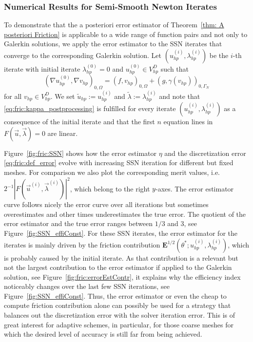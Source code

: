 \documentclass[12pt,twoside,reqno]{amsart}
\theoremstyle{definition}
\numberwithin{equation}{section}
\begin{document}
\subsubsection{Numerical Results for Semi-Smooth Newton Iterates}
To demonstrate that the a posteriori error estimator of Theorem~\ref{thm: A posteriori Friction} is applicable to a wide range of function pairs and not only to Galerkin solutions, we apply the error estimator to the SSN iterates that converge to the corresponding Galerkin solution. Let $(u_{hp}^{(i)},\lambda_{hp}^{(i)})$ be the $i$-th iterate with initial iterate $\lambda_{hp}^{(0)}=0$ and
$u_{hp}^{(0)} \in V^D_{hp}$ such that
\begin{equation*}
      (\nabla u_{hp}^{(0)}, \nabla v_{hp})_{0,\Omega} = (f,v_{hp})_{0,\Omega}+(g,\gamma(v_{hp}))_{0,\Gamma_N}
\end{equation*}
for all $v_{hp} \in V^D_{hp}$. We set $\tilde{u}_{hp}:=u_{hp}^{(i)}$ and $\tilde{\lambda} := \lambda_{hp}^{(i)}$ and note that \eqref{eq:fric:kappa_postprocessing} is fulfilled for every iterate $(u_{hp}^{(i)},\lambda_{hp}^{(i)})$ as a consequence of the initial iterate and that the first $n$ equation lines in $F(\vec{u},\vec{\lambda})=0$ are linear.

Figure~\ref{fig:fric:SSN} shows how the error estimator $\eta$ and the discretization error \eqref{eq:fric:def_error} evolve with increasing SSN iteration for different but fixed meshes. For comparison we also plot the corresponding merit values, i.e.~$2^{-1}|F(\vec{u}^{(i)},\vec{\lambda}^{(i)})|^2$, which belong to the right $y$-axes.
The error estimator curve follows nicely the error curve over all iterations but sometimes overestimates and other times underestimates the true error. The quotient of the error estimator and the true error ranges between $1/3$ and $3$, see Figure~\ref{fig:SSN_effiConst}. For these SSN iterates, the error estimator for the iterates is mainly driven by the friction contribution $\bm{E}^{1/2}(\theta^*;u^{(i)}_{hp},\lambda_{hp}^{(i)})$,  which is probably caused by the initial iterate. As that contribution is a relevant but not the largest contribution to the error estimator if applied to the Galerkin solution, see Figure~\ref{fig:fric:errorEstContr}, it explains why the efficiency index noticeably changes over the last few SSN iterations, see Figure~\ref{fig:SSN_effiConst}.
Thus, the error estimator or even the cheap to compute friction contribution alone can possibly be used for a strategy that balances out the discretization error with the solver iteration error. This is of great interest for adaptive schemes, in particular, for those coarse meshes for which the desired level of accuracy is still far from being achieved.
\end{document}
